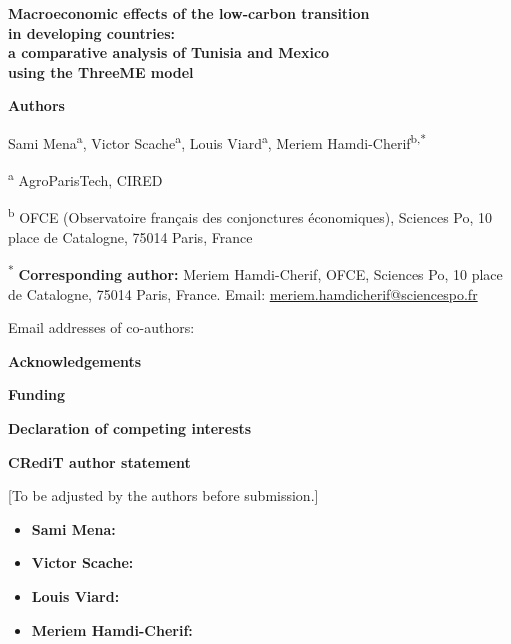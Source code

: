 \documentclass[12pt, a4paper]{article}
\begin{document}
\begin{center}
{\LARGE\bfseries Macroeconomic effects of the low-carbon transition\\
in developing countries:\\
a comparative analysis of Tunisia and Mexico\\
using the ThreeME model\par}
\end{center}

\vspace{1cm}

\textbf{Authors}

Sami Mena\textsuperscript{a}, Victor Scache\textsuperscript{a}, Louis Viard\textsuperscript{a}, Meriem Hamdi-Cherif\textsuperscript{b,*}

\vspace{0.5cm}

\textsuperscript{a} AgroParisTech, CIRED

\textsuperscript{b} OFCE (Observatoire français des conjonctures économiques), Sciences Po, 10 place de Catalogne, 75014 Paris, France

\vspace{0.5cm}

\textsuperscript{*} \textbf{Corresponding author:} Meriem Hamdi-Cherif, OFCE, Sciences Po, 10 place de Catalogne, 75014 Paris, France. Email: \href{mailto:meriem.hamdicherif@sciencespo.fr}{meriem.hamdicherif@sciencespo.fr}

Email addresses of co-authors: 

\vspace{1cm}

\textbf{Acknowledgements}


\vspace{1cm}

\textbf{Funding}



\vspace{1cm}

\textbf{Declaration of competing interests}



\vspace{1cm}

\textbf{CRediT author statement}

[To be adjusted by the authors before submission.]

\begin{itemize}[leftmargin=*]
    \item \textbf{Sami Mena:} 
    \item \textbf{Victor Scache:} 
    \item \textbf{Louis Viard:} 
    \item \textbf{Meriem Hamdi-Cherif:} 
\end{itemize}
\end{document}
